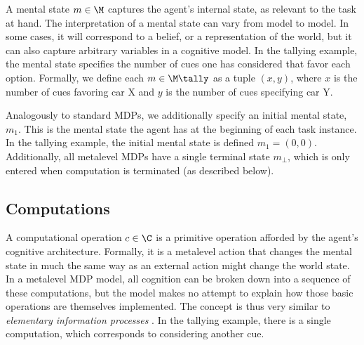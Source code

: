 A mental state $m \in \M$ captures the agent's internal state, as relevant to the task at hand. The interpretation of a mental state can vary from model to model. In some cases, it will correspond to a belief, or a representation of the world, but it can also capture arbitrary variables in a cognitive model. In the tallying example, the mental state specifies the number of cues one has considered that favor each option. Formally, we define each $m \in \M\tally$ as a tuple $(x, y)$, where $x$ is the number of cues favoring car X and $y$ is the number of cues specifying car Y.


Analogously to standard MDPs, we additionally specify an initial mental state, $m_1$. This is the mental state the agent has at the beginning of each task instance. In the tallying example, the initial mental state is defined $m_1 = (0, 0)$. Additionally, all metalevel MDPs have a single terminal state $m_\bot$, which is only entered when computation is terminated (as described below).

\subsection{Computations}
A computational operation $c \in \C$ is a primitive operation afforded by the agent's cognitive architecture. Formally, it is a metalevel action that changes the mental state in much the same way as an external action might change the world state. In a metalevel MDP model, all cognition can be broken down into a sequence of these computations, but the model makes no attempt to explain how those basic operations are themselves implemented. The concept is thus very similar to \emph{elementary information processes} \citep{chase1978elementary,simon1979information,posner1982information,payne1988adaptive}. In the tallying example, there is a single computation, which corresponds to considering another cue.

